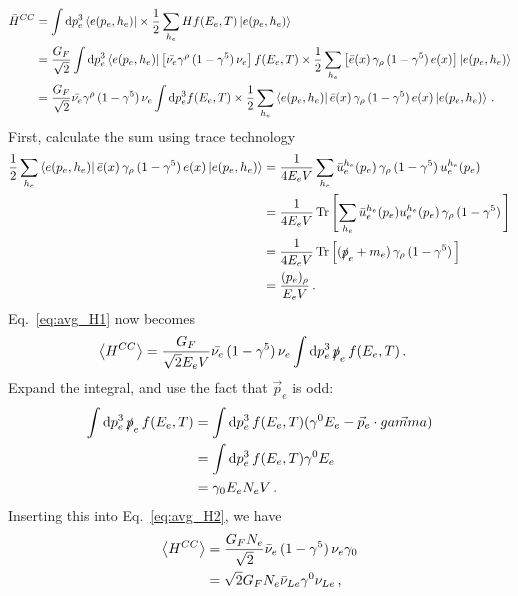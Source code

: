 \documentclass[draft=True]{revtex4-2}
\begin{document}
\begin{align}\label{eq:avg_H1}
    \bar{H}^{CC} &= \int \dd p_e^3 \bra{e(p_e,h_e)} \times \frac{1}{2} \sum_{h_e} H   f(E_e,T) \ket{e(p_e,h_e)} \nonumber \\
           &= \frac{G_F}{\sqrt{2}} \int \dd p_e^3 \bra{e(p_e,h_e)} \left[ \bar{\nu_e} \gamma^\rho\, (1- \gamma^5)\, \nu_e \right]  f(E_e,T) \times \frac{1}{2} \sum_{h_e} \left[\bar e(x) \,\gamma_\rho\, (1- \gamma^5)\, e(x) \right] \ket{e(p_e,h_e)} \nonumber \\
           &= \frac{G_F}{\sqrt{2}} \bar{\nu_e} \gamma^\rho\, (1- \gamma^5)\, \nu_e \int \dd p_e^3  f(E_e,T) \times \frac{1}{2} \sum_{h_e} \bra{e(p_e,h_e)} \bar e(x) \,\gamma_\rho\, (1- \gamma^5)\, e(x)   \ket{e(p_e,h_e)}\,.
\end{align}
First, calculate the sum using trace technology %
\begin{align}\label{eq:helicity_sum}
    \frac{1}{2} \sum_{h_e} \bra{e(p_e,h_e)} \bar e(x) \,\gamma_\rho\, (1- \gamma^5)\, e(x)   \ket{e(p_e,h_e)} &= \frac{1}{4E_e V} \sum_{h_e} \bar{u}_e^{h_e}(p_e) \,\gamma_\rho\, (1- \gamma^5)\, u_e^{h_e}(p_e) \nonumber \\
    &= \frac{1}{4 E_e V} \Trace{\left[ \sum_{h_e} \bar{u}_e^{h_e}(p_e) u_e^{h_e}(p_e) \,\gamma_\rho\, (1- \gamma^5)\, \right]} \nonumber \\
    &= \frac{1}{4 E_e V} \Trace{\left[ (\slashed{p}_e + m_e ) \,\gamma_\rho\, (1- \gamma^5)\, \right]} \nonumber \\
    &= \frac{(p_e)_\rho}{E_e V}\,.
\end{align}
Eq.~\ref{eq:avg_H1} now becomes 
\begin{align}\label{eq:avg_H2}
    \left\langle {H^{CC}} \right \rangle &= \frac{G_F}{\sqrt{2}E_e V} \bar{\nu_e} \, (1- \gamma^5)\, \nu_e \int \dd p_e^3\, \slashed{p}_e\, f(E_e,T)\,.
\end{align}
Expand the integral, and use the fact that $\vec{p}_e$ is odd:
\begin{align}
    \int \dd p_e^3\, \slashed{p}_e\, f(E_e,T) &= \int \dd p_e^3\, f(E_e,T) (\gamma^0 E_e - \vec{p}_e \cdot \vec{gamma}) \nonumber \\
                                              &= \int \dd p_e^3\, f(E_e,T) \gamma^0 E_e \nonumber \\
                                              &= \gamma_0 E_e N_e V\,.
\end{align}
Inserting this into Eq.~\ref{eq:avg_H2}, we have
\begin{align}
    \left\langle {H^{CC}} \right \rangle &= \frac{G_F N_e}{\sqrt{2}} \bar{\nu}_e \, (1- \gamma^5)\, \nu_e \gamma_0 \nonumber \\
            &= \sqrt{2}G_F N_e \bar{\nu}_{Le} \gamma^0 \nu_{Le}\,,
\end{align}
\end{document}
